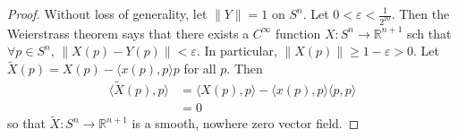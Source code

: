 \begin{proof}
Without loss of generality, let $\| Y \| = 1$ on $S^n$. Let
$0 < \varepsilon < \frac{1}{2^{20}}$. Then the Weierstrass theorem
says that there exists a $C^\infty$ function $X: S^n \to
\mathbb{R}^{n+1}$ sch that $\forall p \in S^n$,
$\| X(p) - Y(p) \| < \varepsilon$. In particular,
$\| X(p) \| \geq 1 - \varepsilon > 0$. Let
$\tilde{X}(p) = X(p) - \langle x(p), p \rangle p$ for all $p$. Then
\begin{align*}
   \langle \tilde{X}(p), p \rangle
&= \langle X(p), p \rangle - \langle x(p), p \rangle \langle p, p
  \rangle \\
&= 0
\end{align*}
so that $\tilde{X} : S^n \to \mathbb{R}^{n+1}$ is a smooth, nowhere
zero vector field.
\end{proof}

